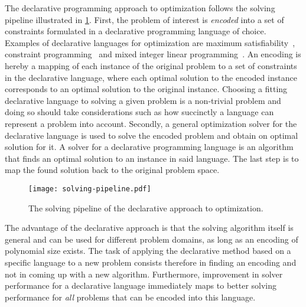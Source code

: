 The declarative programming approach to optimization follows the solving pipeline illustrated in \cref{fig:solving-pipeline}.
First, the problem of interest is \emph{encoded} into a set of constraints formulated in a declarative programming language of choice.
Examples of declarative languages for optimization are maximum satisfiability~\autocite{handbook2-maxsat}, constraint programming~\autocite{DBLP:reference/fai/2} and mixed integer linear programming~\autocites{ChenEtAl2010-intro,KorteVygen2018-5}.
An encoding is hereby a mapping of each instance of the original problem to a set of constraints in the declarative language, where each optimal solution to the encoded instance corresponds to an optimal solution to the original instance.
Choosing a fitting declarative language to solving a given problem is a non-trivial problem and doing so should take considerations such as how succinctly a language can represent a problem into account.
Secondly, a general optimization solver for the declarative language is used to solve the encoded problem and obtain on optimal solution for it.
A solver for a declarative programming language is an algorithm that finds an optimal solution to an instance in said language.
The last step is to map the found solution back to the original problem space.

\begin{figure}
  \centering
  \texttt{[image: solving-pipeline.pdf]}
  \caption{The solving pipeline of the declarative approach to optimization.}\label{fig:solving-pipeline}
\end{figure}

The advantage of the declarative approach is that the solving algorithm itself is general and can be used for different problem domains, as long as an encoding of polynomial size exists.
The task of applying the declarative method based on a specific language to a new problem consists therefore in finding an encoding and not in coming up with a new algorithm.
Furthermore, improvement in solver performance for a declarative language immediately maps to better solving performance for \emph{all} problems that can be encoded into this language.

